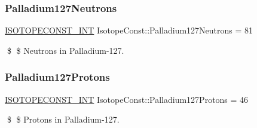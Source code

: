 \subsubsection{\texorpdfstring{Palladium127\+Neutrons}{Palladium127Neutrons}}
{\footnotesize\ttfamily \mbox{\hyperlink{group___isotope_const-_macros_ga5f18360b3e99483a35c32d789e62621c}{I\+S\+O\+T\+O\+P\+E\+C\+O\+N\+S\+T\+\_\+\+I\+NT}} Isotope\+Const\+::\+Palladium127\+Neutrons = 81}

\$ \$ Neutrons in Palladium-\/127. \mbox{\label{group___isotope_const-_palladium-_pd127_ga339aacb0fdd3a69bbce677ca2c78234c}} 
\subsubsection{\texorpdfstring{Palladium127\+Protons}{Palladium127Protons}}
{\footnotesize\ttfamily \mbox{\hyperlink{group___isotope_const-_macros_ga5f18360b3e99483a35c32d789e62621c}{I\+S\+O\+T\+O\+P\+E\+C\+O\+N\+S\+T\+\_\+\+I\+NT}} Isotope\+Const\+::\+Palladium127\+Protons = 46}

\$ \$ Protons in Palladium-\/127. 